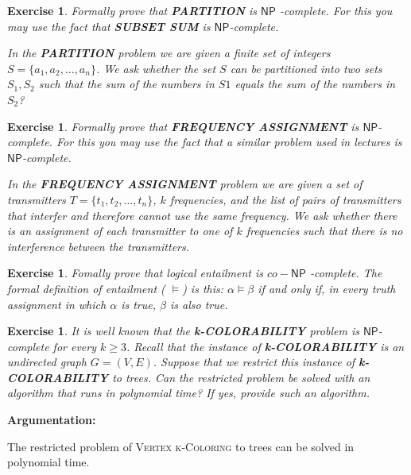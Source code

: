\documentclass[11pt]{article}
\newtheorem{exercise}[theorem]{Exercise}
\begin{document}
\begin{exercise}
\label{ex:partition} Formally prove that \textbf{PARTITION} is $\mathsf{NP}$%
-complete. For this you may use the fact that \textbf{SUBSET SUM} is $%
\mathsf{NP}$-complete.

\smallskip \noindent In the \textbf{PARTITION} problem we are given a finite
set of integers $S=\{a_{1},a_{2},\ldots ,a_{n}\}$. We ask whether the set $S$
can be partitioned into two sets $S_{1},S_{2}$ such that the sum of the
numbers in $S1$ equals the sum of the numbers in $S_{2}$?
\end{exercise}

\begin{exercise}
\label{ex:frequency} Formally prove that \textbf{FREQUENCY ASSIGNMENT} is $%
\mathsf{NP}$-complete. For this you may use the fact that a similar problem
used in lectures is $\mathsf{NP}$-complete.

\noindent In the \textbf{FREQUENCY ASSIGNMENT} problem we are given a set of
transmitters $T=\{t_{1},t_{2},\ldots ,t_{n}\}$, $k$ frequencies, and the
list of pairs of transmitters that interfer and therefore cannot use the
same frequency. We ask whether there is an assignment of each transmitter to
one of $k$ frequencies such that there is no interference between the
transmitters.
\end{exercise}

\begin{exercise}
\label{ex:CO-NP} Fomally prove that logical entailment is $co-\mathsf{NP}$%
-complete. The formal definition of entailment ( $\models $) is this: $%
\alpha \models \beta $ if and only if, in every truth assignment in which $%
\alpha $ is true, $\beta $ is also true.
\end{exercise}

\begin{exercise}
\label{ex:Colors} It is well known that the \textbf{k-COLORABILITY} problem
is $\mathsf{NP}$-complete for every $k\geq 3$. Recall that the instance of 
\textbf{k-COLORABILITY} is an undirected graph $G=(V,E)$. Suppose that we
restrict this instance of \textbf{k-COLORABILITY} to trees. Can the
restricted problem be solved with an algorithm that runs in polynomial time?
If yes, provide such an algorithm.
\end{exercise}

\noindent \textbf{Argumentation:}

The restricted problem of \textsc{Vertex k-Coloring} to trees can be solved
in polynomial time.
\end{document}

